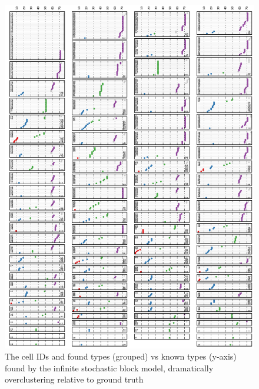 \documentclass{nature}
\begin{document}
\begin{figure}[h!]
  \centering 
    \centerline{\includegraphics[width=6.0in]{mouseretina/retina.1.2.bb.0.0.data-fixed_20_100-anneal_slow_400.truth_latent.pdf}}
  \caption{The cell IDs and found types (grouped) vs known types (y-axis)  found by the infinite stochastic block model, dramatically overclustering relative to ground truth}
\label{fig:supp:retinabbclusters}
\end{figure}
\end{document}
